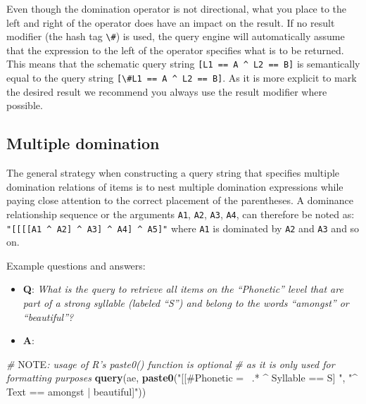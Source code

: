 \documentclass[]{book}
\newenvironment{Shaded}{\begin{snugshade}}{\end{snugshade}}
\newcommand{\AlertTok}[1]{\textcolor[rgb]{0.94,0.16,0.16}{#1}}
\newcommand{\CommentTok}[1]{\textcolor[rgb]{0.56,0.35,0.01}{\textit{#1}}}
\newcommand{\KeywordTok}[1]{\textcolor[rgb]{0.13,0.29,0.53}{\textbf{#1}}}
\newcommand{\NormalTok}[1]{#1}
\newcommand{\StringTok}[1]{\textcolor[rgb]{0.31,0.60,0.02}{#1}}
\providecommand{\tightlist}{%
  \setlength{\itemsep}{0pt}\setlength{\parskip}{0pt}}
\begin{document}
Even though the domination operator is not directional, what you place to the left and right of the operator does have an impact on the result. If no result modifier (the hash tag \texttt{\textbackslash{}\#}) is used, the query engine will automatically assume that the expression to the left of the operator specifies what is to be returned. This means that the schematic query string \texttt{{[}L1\ ==\ A\ \^{}\ L2\ ==\ B{]}} is semantically equal to the query string \texttt{{[}\textbackslash{}\#L1\ ==\ A\ \^{}\ L2\ ==\ B{]}}. As it is more explicit to mark the desired result we recommend you always use the result modifier where possible.

\hypertarget{multiple-domination}{%
\subsection{Multiple domination}\label{multiple-domination}}

The general strategy when constructing a query string that specifies multiple domination relations of items is to nest multiple domination expressions while paying close attention to the correct placement of the parentheses. A dominance relationship sequence or the arguments \texttt{A1}, \texttt{A2}, \texttt{A3}, \texttt{A4}, can therefore be noted as: \texttt{"{[}{[}{[}{[}A1\ \^{}\ A2{]}\ \^{}\ A3{]}\ \^{}\ A4{]}\ \^{}\ A5{]}"} where \texttt{A1} is dominated by \texttt{A2} and \texttt{A3} and so on.

Example questions and answers:

\begin{itemize}
\tightlist
\item
  \textbf{Q}: \emph{What is the query to retrieve all items on the ``Phonetic'' level that are part of a strong syllable (labeled ``S'') and belong to the words ``amongst'' or ``beautiful''?}
\item
  \textbf{A}:
\end{itemize}

\begin{Shaded}
\begin{Highlighting}[]
\CommentTok{# }\AlertTok{NOTE}\CommentTok{: usage of R's paste0() function is optional}
\CommentTok{# as it is only used for formatting purposes}
\KeywordTok{query}\NormalTok{(ae, }\KeywordTok{paste0}\NormalTok{(}\StringTok{"[[#Phonetic =~ .* ^ Syllable == S] "}\NormalTok{,}
                 \StringTok{"^ Text == amongst | beautiful]"}\NormalTok{))}
\end{Highlighting}
\end{Shaded}
\end{document}
